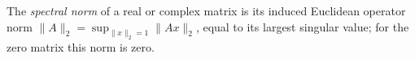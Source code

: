 
The \emph{spectral norm} of a real or complex matrix is its induced Euclidean operator norm $\|A\|_2=\sup_{\|x\|_2=1}\|Ax\|_2$, equal to its largest singular value; for the zero matrix this norm is zero.
